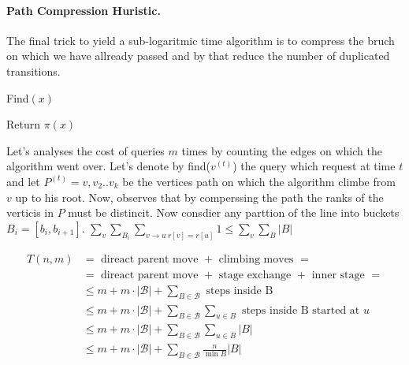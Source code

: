 \paragraph{Path Compression Huristic.} The final trick to yield a sub-logaritmic time algorithm is to compress the bruch on which we have allready passed and by that reduce the number of duplicated transitions.     
\begin{algbox}{Find$(x)$}
  \begin{algorithm}[H]
    Return $\pi\left(x\right)$ 
  \end{algorithm}    
\end{algbox}
Let's analyses the cost of queries $m$ times by counting the edges on which the algorithm went over. Let's denote by find($v^{(t)}$) the query which request at time $t$ and let $P^{(t)}=v,v_{2} .. v_{k}$ be the vertices path on which the algorithm climbe from $v$ up to his root. Now, observes that by comperssing the path the ranks of the verticis in $P$ must be distincit. Now consdier any parttion of the line into buckets $B_{i} = [b_{i} ,b_{i+1}]$. $\sum_{v}{\sum_{B_{i}}{\sum_{v \rightarrow u \ r[v]=r[u] }{1}}} \le \sum_{v}{\sum_{B}{|B|}}$   



\begin{equation*}
  \begin{split}
    T\left( n, m  \right) &= \text{ direact parent move } + \text{ climbing moves  } =    \\
    &=  \text{ direact parent move } + \text{ stage exchange } +  \text{ inner stage } = \\ 
    & \le m + m \cdot | \mathcal{B} | + \sum_{ B \in \mathcal{B} }{ \text{ steps inside B  }   }\\
    & \le m + m \cdot | \mathcal{B} | + \sum_{ B \in \mathcal{B} }{ \sum_{u \in B} { \text{ steps inside B started at }u }  }\\
    & \le m + m \cdot | \mathcal{B} | + \sum_{ B \in \mathcal{B} }{ \sum_{u \in B}{ |B| }  } \\ 
    & \le m + m \cdot | \mathcal{B} | + \sum_{ B \in \mathcal{B} }{ \frac{n}{\min{B} } |B| }
  \end{split}
\end{equation*}




